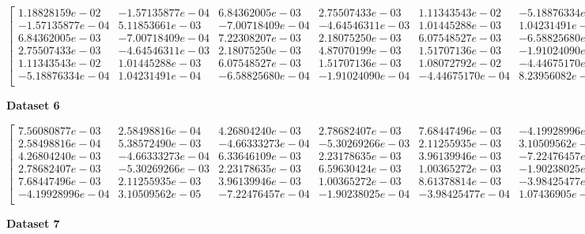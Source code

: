 \documentclass{article}
\begin{document}
\begin{equation}
    \begin{bmatrix}
        1.18828159e-02  & -1.57135877e-04 & 6.84362005e-03  & 2.75507433e-03  & 1.11343543e-02  & -5.18876334e-04 \\
        -1.57135877e-04 & 5.11853661e-03  & -7.00718409e-04 & -4.64546311e-03 & 1.01445288e-03  & 1.04231491e-04  \\
        6.84362005e-03  & -7.00718409e-04 & 7.22308207e-03  & 2.18075250e-03  & 6.07548527e-03  & -6.58825680e-04 \\
        2.75507433e-03  & -4.64546311e-03 & 2.18075250e-03  & 4.87070199e-03  & 1.51707136e-03  & -1.91024090e-04 \\
        1.11343543e-02  & 1.01445288e-03  & 6.07548527e-03  & 1.51707136e-03  & 1.08072792e-02  & -4.44675170e-04 \\
        -5.18876334e-04 & 1.04231491e-04  & -6.58825680e-04 & -1.91024090e-04 & -4.44675170e-04 & 8.23956082e-05  \\
    \end{bmatrix}
\end{equation}

\noindent\textbf{Dataset 6}

\begin{equation}
    \begin{bmatrix}
        7.56080877e-03  & 2.58498816e-04  & 4.26804240e-03  & 2.78682407e-03  & 7.68447496e-03  & -4.19928996e-04 \\
        2.58498816e-04  & 5.38572490e-03  & -4.66333273e-04 & -5.30269266e-03 & 2.11255935e-03  & 3.10509562e-05  \\
        4.26804240e-03  & -4.66333273e-04 & 6.33646109e-03  & 2.23178635e-03  & 3.96139946e-03  & -7.22476457e-04 \\
        2.78682407e-03  & -5.30269266e-03 & 2.23178635e-03  & 6.59630424e-03  & 1.00365272e-03  & -1.90238025e-04 \\
        7.68447496e-03  & 2.11255935e-03  & 3.96139946e-03  & 1.00365272e-03  & 8.61378814e-03  & -3.98425477e-04 \\
        -4.19928996e-04 & 3.10509562e-05  & -7.22476457e-04 & -1.90238025e-04 & -3.98425477e-04 & 1.07436905e-04  \\
    \end{bmatrix}
\end{equation}

\noindent\textbf{Dataset 7}
\end{document}
